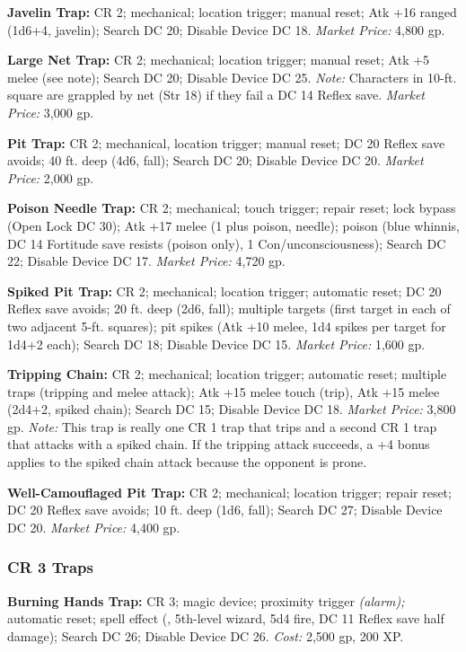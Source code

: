 \textbf{Javelin Trap:} CR 2; mechanical; location trigger; manual reset; Atk +16 
ranged (1d6+4, javelin); Search DC 20; Disable Device DC 18. \textit{Market Price: 
}4,800 gp.

\textbf{Large Net Trap:} CR 2; mechanical; location trigger; manual reset; Atk 
+5 melee (see note); Search DC 20; Disable Device DC 25. \textit{Note:} Characters 
in 10-ft. square are grappled by net (Str 18) if they fail a DC 14 Reflex save. 
\textit{Market Price:} 3,000 gp.

\textbf{Pit Trap:} CR 2; mechanical, location trigger; manual reset; DC 20 Reflex 
save avoids; 40 ft. deep (4d6, fall); Search DC 20; Disable Device DC 20. \textit{Market 
Price:} 2,000 gp.

\textbf{Poison Needle Trap:} CR 2; mechanical; touch trigger; repair reset; lock 
bypass (Open Lock DC 30); Atk +17 melee (1 plus poison, needle); poison (blue whinnis, 
DC 14 Fortitude save resists (poison only), 1 Con/unconsciousness); Search DC 22; 
Disable Device DC 17. \textit{Market Price:} 4,720 gp.

\textbf{Spiked Pit Trap:} CR 2; mechanical; location trigger; automatic reset; 
DC 20 Reflex save avoids; 20 ft. deep (2d6, fall); multiple targets (first target 
in each of two adjacent 5-ft. squares); pit spikes (Atk +10 melee, 1d4 spikes per 
target for 1d4+2 each); Search DC 18; Disable Device DC 15. \textit{Market Price: 
}1,600 gp.

\textbf{Tripping Chain:} CR 2; mechanical; location trigger; automatic reset; multiple 
traps (tripping and melee attack); Atk +15 melee touch (trip), Atk +15 melee (2d4+2, 
spiked chain); Search DC 15; Disable Device DC 18. \textit{Market Price:} 3,800 
gp. \textit{Note:} This trap is really one CR 1 trap that trips and a second CR 
1 trap that attacks with a spiked chain. If the tripping attack succeeds, a +4 
bonus applies to the spiked chain attack because the opponent is prone.

\textbf{Well-Camouflaged Pit Trap:} CR 2; mechanical; location trigger; repair 
reset; DC 20 Reflex save avoids; 10 ft. deep (1d6, fall); Search DC 27; Disable 
Device DC 20. \textit{Market Price:} 4,400 gp.

\subsubsection{CR 3 Traps}

\textbf{Burning Hands Trap:} CR 3; magic device; proximity trigger 
\textit{(alarm); }automatic reset; spell effect (, 5th-level 
wizard, 5d4 fire, DC 11 Reflex save half damage); Search DC 26; Disable Device 
DC 26. \textit{Cost:} 2,500 gp, 200 XP.

